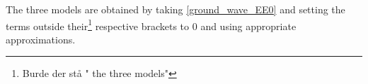 The three models are obtained by taking \eqref{ground_wave_EE0} and setting the terms outside their\footnote{Burde der stå " the three models"} respective brackets to 0 and using appropriate approximations.
















